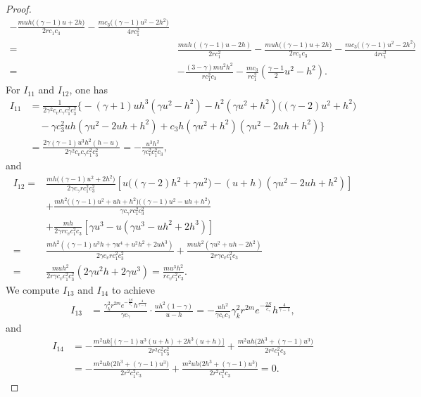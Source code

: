 \documentclass[10pt,a4paper]{amsart}
\begin{document}
\begin{proof}
\begin{align*}
- \frac{m u h\big((\gamma-1)u+2h\big)}{2r c_1 c_3}
- \frac{m c_3\big((\gamma-1)u^{2}-2h^{2}\big)}{4r c_1^2} \\
=& \frac{muh ((\gamma-1)u-2h)}{2r c_1^2}- \frac{m u h\big((\gamma-1)u+2h\big)}{2r c_1 c_3}
- \frac{m c_3\big((\gamma-1)u^{2}-2h^{2}\big)}{4r c_1^2} \\
=& -\frac{(3-\gamma) m u^2 h^2}{r c_1^2 c_3}- \frac{m c_3}{r c_1^2}\left( \frac{\gamma-1}{2}u^{2} - h^{2} \right).
\end{align*}
For $I_{11}$ and $I_{12}$, one has
\begin{align*}
I_{11}
&= \frac{1}{2\gamma^{2} c_v c_\gamma c_1^{2} c_3^{2}} \bigg\{
   -(\gamma+1)uh^{3}(\gamma u^{2}-h^{2})
   - h^{2}(\gamma u^{2}+h^{2})\big((\gamma-2)u^{2}+h^{2}\big) \\
&\quad - \gamma c_3^{2} uh(\gamma u^{2}-2uh+h^{2})
   +c_3 h(\gamma u^{2}+h^{2})(\gamma u^{2}-2uh+h^{2}) \bigg\} \\
&= \frac{2\gamma(\gamma-1)u^3 h^2(h-u)}{2\gamma^{2} c_v c_\gamma c_1^{2} c_3^2} = -\frac{u^3 h^2}{\gamma c_v^2 c_1^{2} c_3},
\end{align*}
and
\begin{align*}
I_{12}
=& \frac{mh\big((\gamma-1)u^{2}+2h^{2}\big)}{2\gamma c_\gamma r c_1^{2}c_3^{2}} \left[ u\big((\gamma-2)h^{2}+\gamma u^{2}\big)
- (u+h)(\gamma u^{2}-2uh+h^{2}) \right] \\
&+ \frac{mh^{2}\big((\gamma-1)u^{2}+uh+h^{2}\big)\big((\gamma-1)u^{2}-uh+h^{2}\big)}{\gamma c_\gamma r c_1^{2} c_3^{2}} \\
&+ \frac{mh}{2\gamma rc_v c_1^{2} c_3} \left[ \gamma u^{3}
- u(\gamma u^{3}-uh^{2}+2h^{3}) \right]\\
=&\frac{mh^2\left( (\gamma-1)u^3 h + \gamma u^4 + u^2 h^2 + 2 u h^3 \right)}{2\gamma c_v r c_1^{2} c_3^{2}}
  +\frac{muh^2\left( \gamma u^2 + uh -2 h^2 \right)}{2r \gamma c_v c_1^2 c_3}\\
=&\frac{mu h^2 }{2r\gamma c_v c_1^2 c_3^2} \left( 2\gamma u^2 h + 2\gamma u^3  \right)
= \frac{mu^3 h^2 }{r c_v c_1^2 c_3}.
\end{align*}
We compute $I_{13}$ and $I_{14}$ to achieve
\begin{align*}
I_{13}
&= \frac{\gamma_k^2 r^{2m} e^{-\frac{2S}{c_\gamma}} h^{\frac{4}{\gamma-1}} }{\gamma c_{\gamma}}
\cdot \frac{u h^2(1 - \gamma)}{u-h}  = -\frac{u h^2}{\gamma c_v c_1}\gamma_k^2 r^{2m} e^{-\frac{2S}{c_\gamma}} h^{\frac{4}{\gamma-1}},
\end{align*}
and
\begin{align*}
I_{14}
&= -\frac{m^{2}uh\big[ (\gamma-1)u^{3}(u+h) + 2h^{3}(u+h) \big]}{2r^{2} c_1^{2} c_3^{2}}
   + \frac{m^{2}uh\big(2h^{3}+(\gamma-1)u^{3}\big)}{2r^{2} c_1^{2} c_3} \\
&= -\frac{m^{2}uh\big(2h^{3}+(\gamma-1)u^{3}\big)}{2r^{2} c_1^{2} c_3}
   + \frac{m^{2}uh\big(2h^{3}+(\gamma-1)u^{3}\big)}{2r^{2} c_1^{2} c_3}= 0.
\end{align*}


\end{proof}
\end{document}
